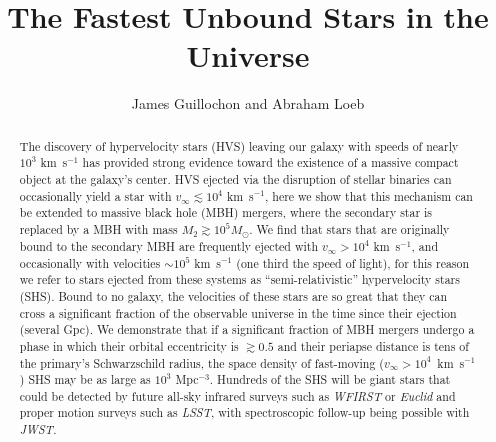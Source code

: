 \documentclass[a4paper,twocolumn]{emulateapj}
\begin{document}


\title{The Fastest Unbound Stars in the Universe}

\author{James Guillochon and Abraham Loeb}


\begin{abstract} 
The discovery of hypervelocity stars (HVS) leaving our galaxy with speeds of nearly $10^{3}$ km~s$^{-1}$ has provided strong evidence toward the existence of a massive compact object at the galaxy's center. HVS ejected via the disruption of stellar binaries can occasionally yield a star with $v_{\infty} \lesssim 10^4$ km~s$^{-1}$, here we show that this mechanism can be extended to massive black hole (MBH) mergers, where the secondary star is replaced by a MBH with mass $M_2 \gtrsim 10^5 M_{\odot}$. We find that stars that are originally bound to the secondary MBH are frequently ejected with $v_{\infty} > 10^4$ km~s$^{-1}$, and occasionally with velocities $\sim 10^5$ km~s$^{-1}$ (one third the speed of light), for this reason we refer to stars ejected from these systems as ``semi-relativistic'' hypervelocity stars (SHS). Bound to no galaxy, the velocities of these stars are so great that they can cross a significant fraction of the observable universe in the time since their ejection (several Gpc). We demonstrate that if a significant fraction of MBH mergers undergo a phase in which their orbital eccentricity is $\gtrsim 0.5$ and their periapse distance is tens of the primary's Schwarzschild radius, the space density of fast-moving ($v_{\infty} > 10^{4}$~km~s$^{-1}$) SHS may be as large as $10^{3}$ Mpc$^{-3}$. Hundreds of the SHS will be giant stars that could be detected by future all-sky infrared surveys such as {\it WFIRST} or {\it Euclid} and proper motion surveys such as {\it LSST}, with spectroscopic follow-up being possible with {\it JWST}.
\end{abstract}

\end{document}
